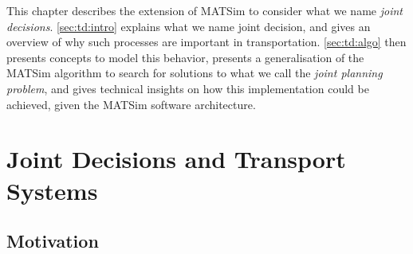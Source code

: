 { %


\newcommand\authoranddate{\citet}
\newcommand\eg{\emph{e.g.}\xspace}
\newcommand\eg{\emph{i.e.}\xspace}
\newcommand\pudptw{Pick-Up and Delivery Problem With Time Windows\xspace}
\newcommand\structeqmodel{structural equation model\xspace}
\newcommand\ga{genetic algorithm\xspace}
\newcommand\gas{genetic algorithms\xspace}
\newcommand\Gas{Genetic algorithms\xspace}
\renewcommand\matsim{MATSim\xspace}

\newcommand\insfig[2]{%
	\insfigwidth{#1}{#2}{.8\textwidth}
}
\newcommand\insfigwidth[3]{%
\createfigure{#1}{#1}{}{%
		\texttt{[image: extending/figures/Jointtrips/\#2]}%
		}{}%
}

\newcommand\inssubfigwidth[3]{%
\createsubfigure{#2}{%
		\texttt{[image: extending/figures/Jointtrips/\#3]}%
		}{}{\quad}%
}
\newcommand\inssubfig[2]{%
\inssubfigwidth{.46\textwidth}{#1}{#2}%
}
\newcommand\insfigwithsubfigs[2]{%
\createfigure{#1}{#1}{}{%
		#2%
		}{}%
}


This chapter describes the extension of \matsim to consider what we name \emph{joint decisions}.
\cref{sec:td:intro} explains what we name joint decision, and gives an overview of why such processes
are important in transportation.
\cref{sec:td:algo} then presents concepts to model this behavior,
presents a generalisation of the \matsim algorithm to search for solutions to what
we call the \emph{joint planning problem},
and gives technical insights on how this implementation could be achieved,
given the \matsim software architecture.

\section{Joint Decisions and Transport Systems\label{sec:td:intro}}

\subsection{Motivation}

}
